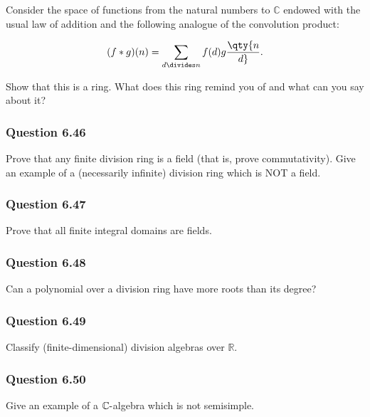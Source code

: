 Consider the space of functions from the natural numbers to
\({\mathbb{C}}\) endowed with the usual law of addition and the
following analogue of the convolution product:

\begin{align*}
(f\ast g)(n) = \sum_{d\divides n}^{}f(d) g\qty{n\over d}
.\end{align*}

Show that this is a ring. What does this ring remind you of and what can
you say about it?

\hypertarget{question-6.46}{%
\subsubsection{Question 6.46}\label{question-6.46}}

Prove that any finite division ring is a field (that is, prove
commutativity). Give an example of a (necessarily infinite) division
ring which is NOT a field.

\hypertarget{question-6.47}{%
\subsubsection{Question 6.47}\label{question-6.47}}

Prove that all finite integral domains are fields.

\hypertarget{question-6.48}{%
\subsubsection{Question 6.48}\label{question-6.48}}

Can a polynomial over a division ring have more roots than its degree?

\hypertarget{question-6.49}{%
\subsubsection{Question 6.49}\label{question-6.49}}

Classify (finite-dimensional) division algebras over \({\mathbb{R}}\).

\hypertarget{question-6.50}{%
\subsubsection{Question 6.50}\label{question-6.50}}

Give an example of a \({\mathbb{C}}{\hbox{-}}\)algebra which is not
semisimple.

